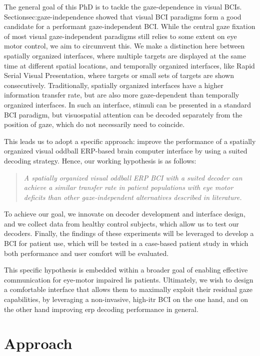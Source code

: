The general goal of this PhD is to tackle the gaze-dependence in visual BCIs.
Section{sec:gaze-independence} showed that visual BCI paradigms form
a good candidate for a performant gaze-independent BCI.
While the central gaze fixation of most visual gaze-independent paradigms still
relies to some extent on eye motor control, we aim to circumvent this.
We make a distinction here between spatially organized interfaces, where
multiple targets are displayed at the same time at different spatial locations,
and temporally organized interfaces, like Rapid Serial Visual
Presentation,
where targets or small sets of targets are shown consecutively.
Traditionally, spatially organized interfaces have a higher information transfer
rate, but are also more gaze-dependent than temporally organized interfaces.
In such an interface, stimuli can be presented in a standard BCI paradigm, but
visuospatial attention can be decoded separately from the position of gaze,
which do not necessarily need to coincide.

This leads us to adopt a specific approach: improve the performance of a
spatially organized visual oddball ERP-based brain
computer interface by using a suited decoding strategy.
Hence, our working hypothesis is as follows:
\begin{quote}
	\textit{A spatially organized visual oddball ERP BCI with a suited decoder
		can achieve a similar transfer rate in patient
		populations with eye motor deficits than other gaze-independent alternatives
    described in literature.}
\end{quote}

To achieve our goal, we innovate on decoder development and interface design,
and we collect data from healthy control subjects, which allow us to test our decoders.
Finally, the findings of these experiments will be leveraged to develop a BCI
for patient use, which will be tested in a case-based patient study in which
both performance and user comfort will be evaluated.

This specific hypothesis is embedded within a broader goal of enabling
effective communication for eye-motor impaired \ac{lis} patients.
Ultimately, we wish to design a comfortable interface that allows them to maximally exploit
their residual gaze capabilities, by leveraging a non-invasive, high-\ac{itr}
BCI on the one hand, and on the other hand improving \ac{erp} decoding performance
in general.

\section{Approach}

